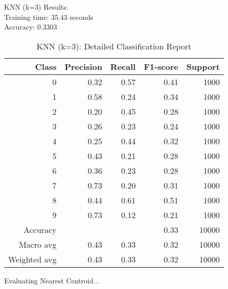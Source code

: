 KNN (k=3) Results:\\
Training time: 35.43 seconds\\
Accuracy: 0.3303
\begin{table}[H]
  \centering
  \begin{tabular}{r r r r r}
    \toprule
    Class & Precision & Recall & F1-score & Support \\
    \midrule
    0 & 0.32 & 0.57 & 0.41 & 1000 \\
    1 & 0.58 & 0.24 & 0.34 & 1000 \\
    2 & 0.20 & 0.45 & 0.28 & 1000 \\
    3 & 0.26 & 0.23 & 0.24 & 1000 \\
    4 & 0.25 & 0.44 & 0.32 & 1000 \\
    5 & 0.43 & 0.21 & 0.28 & 1000 \\
    6 & 0.36 & 0.23 & 0.28 & 1000 \\
    7 & 0.73 & 0.20 & 0.31 & 1000 \\
    8 & 0.44 & 0.61 & 0.51 & 1000 \\
    9 & 0.73 & 0.12 & 0.21 & 1000 \\
    \midrule
    Accuracy & & & 0.33 & 10000 \\
    Macro avg & 0.43 & 0.33 & 0.32 & 10000 \\
    Weighted avg & 0.43 & 0.33 & 0.32 & 10000 \\
    \bottomrule
  \end{tabular}
  \vspace{10pt}
  \caption{KNN (k=3): Detailed Classification Report}
\end{table}

Evaluating Nearest Centroid...\\

